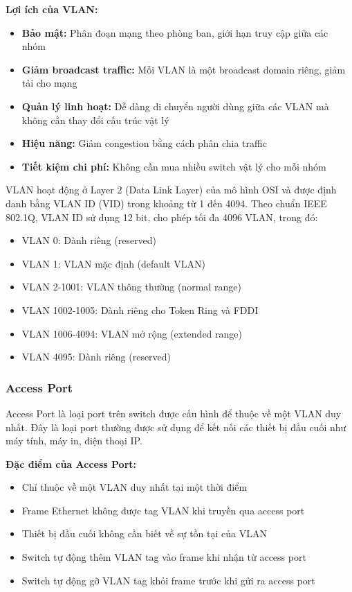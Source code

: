 \textbf{Lợi ích của VLAN:}
\begin{itemize}
    \item \textbf{Bảo mật:} Phân đoạn mạng theo phòng ban, giới hạn truy cập giữa các nhóm
    \item \textbf{Giảm broadcast traffic:} Mỗi VLAN là một broadcast domain riêng, giảm tải cho mạng
    \item \textbf{Quản lý linh hoạt:} Dễ dàng di chuyển người dùng giữa các VLAN mà không cần thay đổi cấu trúc vật lý
    \item \textbf{Hiệu năng:} Giảm congestion bằng cách phân chia traffic
    \item \textbf{Tiết kiệm chi phí:} Không cần mua nhiều switch vật lý cho mỗi nhóm
\end{itemize}

VLAN hoạt động ở Layer 2 (Data Link Layer) của mô hình OSI và được định danh bằng VLAN ID (VID) trong khoảng từ 1 đến 4094. Theo chuẩn IEEE 802.1Q, VLAN ID sử dụng 12 bit, cho phép tối đa 4096 VLAN, trong đó:
\begin{itemize}
    \item VLAN 0: Dành riêng (reserved)
    \item VLAN 1: VLAN mặc định (default VLAN)
    \item VLAN 2-1001: VLAN thông thường (normal range)
    \item VLAN 1002-1005: Dành riêng cho Token Ring và FDDI
    \item VLAN 1006-4094: VLAN mở rộng (extended range)
    \item VLAN 4095: Dành riêng (reserved)
\end{itemize}

\subsubsection{Access Port}
Access Port là loại port trên switch được cấu hình để thuộc về một VLAN duy nhất. Đây là loại port thường được sử dụng để kết nối các thiết bị đầu cuối như máy tính, máy in, điện thoại IP.

\textbf{Đặc điểm của Access Port:}
\begin{itemize}
    \item Chỉ thuộc về một VLAN duy nhất tại một thời điểm
    \item Frame Ethernet không được tag VLAN khi truyền qua access port
    \item Thiết bị đầu cuối không cần biết về sự tồn tại của VLAN
    \item Switch tự động thêm VLAN tag vào frame khi nhận từ access port
    \item Switch tự động gỡ VLAN tag khỏi frame trước khi gửi ra access port
\end{itemize}

